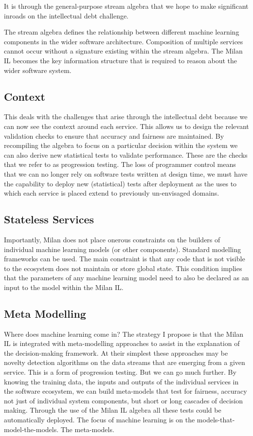 \documentclass[a4paper]{caesar_book}
\begin{document}
It is through the general-purpose stream algebra that we hope to make significant inroads on the intellectual debt challenge.

The stream algebra defines the relationship between different machine learning components in the wider software architecture. Composition of multiple services cannot occur without a signature existing within the stream algebra. The Milan IL becomes the key information structure that is required to reason about the wider software system.

\subsection{Context}

This deals with the challenges that arise through the intellectual debt because we can now see the context around each service. This allows us to design the relevant validation checks to ensure that accuracy and fairness are maintained. By recompiling the algebra to focus on a particular decision within the system we can also derive new statistical tests to validate performance. These are the checks that we refer to as progression testing. The loss of programmer control means that we can no longer rely on software tests written at design time, we must have the capability to deploy new (statistical) tests after deployment as the uses to which each service is placed extend to previously un-envisaged domains.

\subsection{Stateless Services}

Importantly, Milan does not place onerous constraints on the builders of individual machine learning models (or other components). Standard modelling frameworks can be used. The main constraint is that any code that is not visible to the ecosystem does not maintain or store global state. This condition implies that the parameters of any machine learning model need to also be declared as an input to the model within the Milan IL.

\subsection{Meta Modelling}

Where does machine learning come in? The strategy I propose is that the Milan IL is integrated with meta-modelling approaches to assist in the explanation of the decision-making framework. At their simplest these approaches may be novelty detection algorithms on the data streams that are emerging from a given service. This is a form of progression testing. But we can go much further. By knowing the training data, the inputs and outputs of the individual services in the software ecosystem, we can build meta-models that test for fairness, accuracy not just of individual system components, but short or long cascades of decision making. Through the use of the Milan IL algebra all these tests could be automatically deployed. The focus of machine learning is on the models-that-model-the-models. The meta-models.
\end{document}
